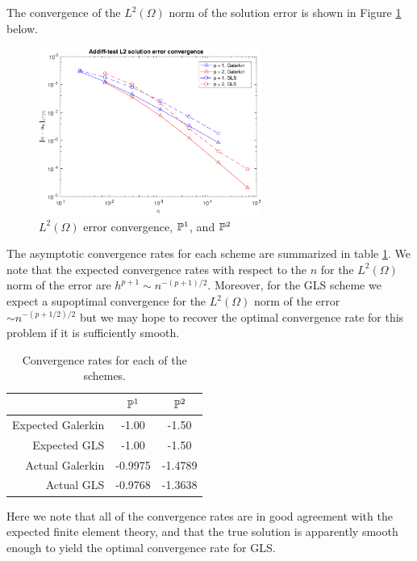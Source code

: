 \documentclass{article}
\begin{document}
\begin{itemize}
	The convergence of the \(L^2(\Omega)\) norm of the solution error is shown in Figure \ref{fig:addiff-test_conv} below.
	\begin{figure}[H]
		\centering
		\includegraphics[width=0.65\textwidth]{addiff-test_conv_2.pdf}
		\caption{\(L^2(\Omega)\) error convergence, \(\mathbb{P}^1\), and \(\mathbb{P}^2 \)}
		\label{fig:addiff-test_conv}
	\end{figure}
	The asymptotic convergence rates for each scheme are summarized in table \ref{tab:addiff-test_conv}. We note that the expected convergence rates with respect to the \(n\) for the \(L^2(\Omega)\) norm of the error are \(h^{p+1} \sim n^{-(p+1)/2} \). Moreover, for the GLS scheme we expect a supoptimal convergence for the \(L^2(\Omega)\) norm of the error \(\sim n^{-(p+1/2)/2} \) but we may hope to recover the optimal convergence rate for this problem if it is sufficiently smooth.
	\begin{table}[H]
		\centering
		\begin{tabular}{r||c|c}
			& \(\mathbb{P}^1 \) & \(\mathbb{P}^2 \) \\
			\hline
			Expected Galerkin & -1.00 & -1.50 \\
			\hline
			Expected GLS & -1.00 & -1.50 \\
			\hline
			Actual Galerkin & -0.9975 & -1.4789 \\
			\hline
			Actual GLS & -0.9768 & -1.3638 \\

		\end{tabular}
		\caption{Convergence rates for each of the schemes.}
		\label{tab:addiff-test_conv}
	\end{table}
	Here we note that all of the convergence rates are in good agreement with the expected finite element theory, and that the true solution is apparently smooth enough to yield the optimal convergence rate for GLS.\\
	

\end{itemize}
\end{document}
